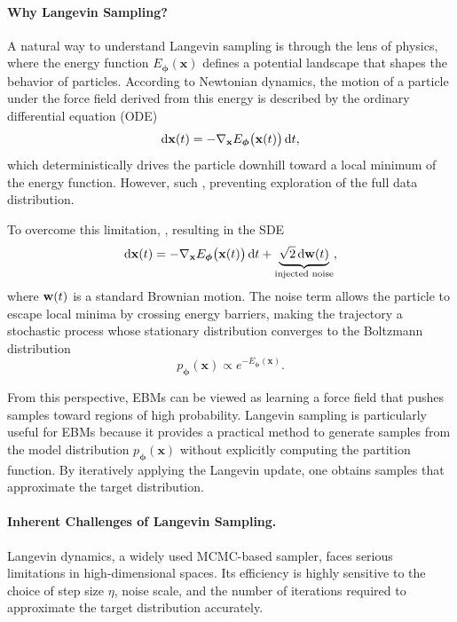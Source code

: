 \paragraph{Why Langevin Sampling?}
A natural way to understand Langevin sampling is through the lens of physics, where the energy function $ E_{\bm{\phi}}(\mathbf{x}) $ defines a potential landscape that shapes the behavior of particles. According to Newtonian dynamics, the motion of a particle under the force field derived from this energy is described by the ordinary differential equation (ODE)
\[
\mathop{}\!\mathrm{d} \mathbf{x}(t) = -\nabla_{\mathbf{x}} E_{\bm{\phi}}\big(\mathbf{x}(t)\big)  \mathop{}\!\mathrm{d} t,
\]
which deterministically drives the particle downhill toward a local minimum of the energy function. However, such , preventing exploration of the full data distribution.

To overcome this limitation, , resulting in the SDE
\[
\mathop{}\!\mathrm{d} \mathbf{x}(t) = -\nabla_{\mathbf{x}} E_{\bm{\phi}}\big(\mathbf{x}(t)\big)  \mathop{}\!\mathrm{d} t + \underbrace{\sqrt{2 } \mathop{}\!\mathrm{d} {\mathbf{w}}(t)}_{\text{injected noise}},
\]
where ${\mathbf{w}}(t)$ is a standard Brownian motion. 
The noise term allows the particle to escape local minima by crossing energy barriers, making the trajectory a stochastic process whose stationary distribution converges to the Boltzmann distribution
\[
p_{\bm{\phi}}(\mathbf{x}) \propto e^{-E_{\bm{\phi}}(\mathbf{x})}.
\]

From this perspective, EBMs can be viewed as learning a force field that pushes samples toward regions of high probability. Langevin sampling is particularly useful for EBMs because it provides a practical method to generate samples from the model distribution $p_{\bm{\phi}}(\mathbf{x})$ without explicitly computing the partition function. By iteratively applying the Langevin update, one obtains samples that approximate the target distribution.


\paragraph{Inherent Challenges of Langevin Sampling.}
Langevin dynamics, a widely used MCMC-based sampler, faces serious limitations in high-dimensional spaces. Its efficiency is highly sensitive to the choice of step size $\eta$, noise scale, and the number of iterations required to approximate the target distribution accurately. 

